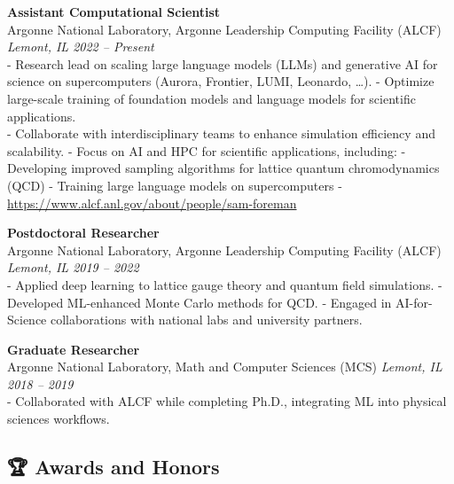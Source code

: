 \documentclass[
  letterpaper,
  DIV=11,
  numbers=noendperiod]{scrartcl}
\begin{document}
\textbf{Assistant Computational Scientist}\\
Argonne National Laboratory, Argonne Leadership Computing Facility
(ALCF)\\
\emph{Lemont, IL \textbar{} 2022 -- Present}\\
- Research lead on scaling large language models (LLMs) and generative
AI for science on supercomputers (Aurora, Frontier, LUMI, Leonardo,
\ldots). - Optimize large-scale training of foundation models and
language models for scientific applications.\\
- Collaborate with interdisciplinary teams to enhance simulation
efficiency and scalability. - Focus on AI and HPC for scientific
applications, including: - Developing improved sampling algorithms for
lattice quantum chromodynamics (QCD) - Training large language models on
supercomputers - \url{https://www.alcf.anl.gov/about/people/sam-foreman}

\textbf{Postdoctoral Researcher}\\
Argonne National Laboratory, Argonne Leadership Computing Facility
(ALCF)\\
\emph{Lemont, IL \textbar{} 2019 -- 2022}\\
- Applied deep learning to lattice gauge theory and quantum field
simulations. - Developed ML-enhanced Monte Carlo methods for QCD. -
Engaged in AI-for-Science collaborations with national labs and
university partners.

\textbf{Graduate Researcher}\\
Argonne National Laboratory, Math and Computer Sciences (MCS)
\emph{Lemont, IL \textbar{} 2018 -- 2019}\\
- Collaborated with ALCF while completing Ph.D., integrating ML into
physical sciences workflows.

\subsection{🏆 Awards and Honors}\label{awards-and-honors}
\end{document}
